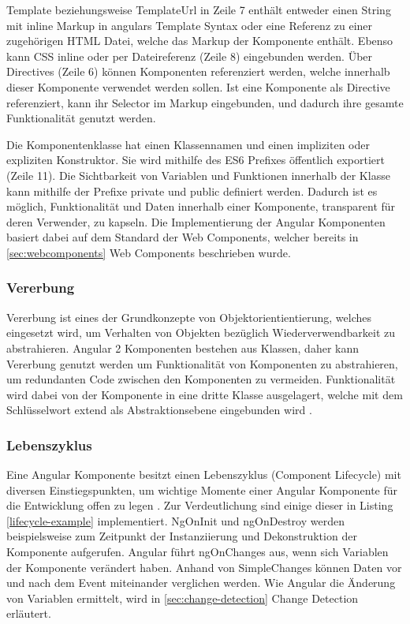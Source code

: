 Template beziehungsweise TemplateUrl in Zeile 7 enthält entweder einen String mit inline Markup in angulars Template Syntax
oder eine Referenz zu einer zugehörigen HTML Datei, welche das Markup der Komponente enthält.
Ebenso kann \ac{CSS} inline oder per Dateireferenz (Zeile 8) eingebunden werden.
Über Directives (Zeile 6) können Komponenten referenziert werden, welche innerhalb dieser Komponente verwendet werden sollen.
Ist eine Komponente als Directive referenziert,
kann ihr Selector im Markup eingebunden,
und dadurch ihre gesamte Funktionalität genutzt werden.

Die Komponentenklasse hat einen Klassennamen und einen impliziten oder expliziten Konstruktor.
Sie wird mithilfe des ES6 Prefixes öffentlich exportiert (Zeile 11).
Die Sichtbarkeit von Variablen und Funktionen innerhalb der Klasse kann mithilfe der Prefixe private und public definiert werden.
Dadurch ist es möglich, Funktionalität und Daten innerhalb einer Komponente, transparent für deren Verwender, zu kapseln.
Die Implementierung der Angular Komponenten basiert dabei auf dem Standard der Web Components, welcher bereits in \ref{sec:webcomponents} Web Components beschrieben wurde.

\newpage




\subsubsection{Vererbung}

Vererbung ist eines der Grundkonzepte von Objektorientientierung,
welches eingesetzt wird, um Verhalten von Objekten bezüglich Wiederverwendbarkeit zu
abstrahieren. Angular 2 Komponenten bestehen aus Klassen, daher
kann Vererbung genutzt werden um Funktionalität von Komponenten zu abstrahieren,
um redundanten Code zwischen den Komponenten
zu vermeiden. Funktionalität wird dabei von der Komponente in eine dritte Klasse ausgelagert,
welche mit dem Schlüsselwort extend als
Abstraktionsebene eingebunden wird \cite{DanWa45:online}.

\subsubsection{Lebenszyklus}
Eine Angular Komponente besitzt einen Lebenszyklus (Component Lifecycle) mit diversen Einstiegspunkten,
um wichtige Momente einer Angular Komponente für die Entwicklung offen zu legen \cite[837-839]{ng-Book-2}.
Zur Verdeutlichung sind einige dieser in Listing \ref{lifecycle-example} implementiert.
NgOnInit und ngOnDestroy werden beispielsweise zum Zeitpunkt der Instanziierung und Dekonstruktion der Komponente aufgerufen.
Angular führt ngOnChanges aus, wenn sich Variablen der Komponente verändert haben. Anhand von SimpleChanges
können Daten vor und nach dem Event miteinander verglichen werden.
Wie Angular die Änderung von Variablen ermittelt, wird in \ref{sec:change-detection} Change Detection erläutert.

